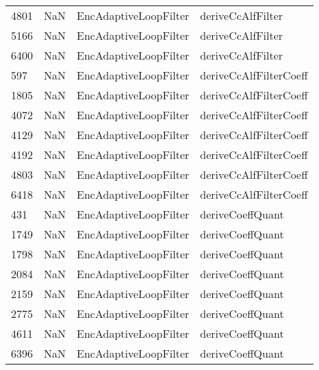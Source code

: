 \begin{tabular}{llll}
4801 &                   NaN &      EncAdaptiveLoopFilter &                         deriveCcAlfFilter \\
5166 &                   NaN &      EncAdaptiveLoopFilter &                         deriveCcAlfFilter \\
6400 &                   NaN &      EncAdaptiveLoopFilter &                         deriveCcAlfFilter \\
597  &                   NaN &      EncAdaptiveLoopFilter &                    deriveCcAlfFilterCoeff \\
1805 &                   NaN &      EncAdaptiveLoopFilter &                    deriveCcAlfFilterCoeff \\
4072 &                   NaN &      EncAdaptiveLoopFilter &                    deriveCcAlfFilterCoeff \\
4129 &                   NaN &      EncAdaptiveLoopFilter &                    deriveCcAlfFilterCoeff \\
4192 &                   NaN &      EncAdaptiveLoopFilter &                    deriveCcAlfFilterCoeff \\
4803 &                   NaN &      EncAdaptiveLoopFilter &                    deriveCcAlfFilterCoeff \\
6418 &                   NaN &      EncAdaptiveLoopFilter &                    deriveCcAlfFilterCoeff \\
431  &                   NaN &      EncAdaptiveLoopFilter &                          deriveCoeffQuant \\
1749 &                   NaN &      EncAdaptiveLoopFilter &                          deriveCoeffQuant \\
1798 &                   NaN &      EncAdaptiveLoopFilter &                          deriveCoeffQuant \\
2084 &                   NaN &      EncAdaptiveLoopFilter &                          deriveCoeffQuant \\
2159 &                   NaN &      EncAdaptiveLoopFilter &                          deriveCoeffQuant \\
2775 &                   NaN &      EncAdaptiveLoopFilter &                          deriveCoeffQuant \\
4611 &                   NaN &      EncAdaptiveLoopFilter &                          deriveCoeffQuant \\
6396 &                   NaN &      EncAdaptiveLoopFilter &                          deriveCoeffQuant \\

\end{tabular}
